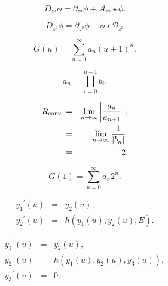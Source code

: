 \documentclass[]{article}
\begin{document}
	









\begin{equation}\label{eq:uplus-cd}
	D_{z^a}\phi = \partial_{z^a}\phi+\mathcal{A}_{z^a}\star\phi.
\end{equation}




\begin{equation}
	D_{z^a}\phi = \partial_{z^a}\phi-\phi\star\mathcal{B}_{z^a}
\end{equation}











\begin{equation}
	\label{ansatza}
	G(u) = \sum_{n=0}^{\infty} a_n \left(u+1 \right)^n.
\end{equation}





\begin{equation}
	a_n = \prod_{i=0}^{n-1} b_i.
\end{equation}



\begin{eqnarray}
	\nonumber
	R_{{\rm conv.}} &=& \lim_{n \to \infty} \left| \frac{a_n}{a_{n+1}} \right|, \\
	\nonumber
	&=& \lim_{n \to \infty} \frac{1}{ |b_n| },  \\
	&=& 2. 
\end{eqnarray}

\begin{equation}
	\label{G(1)}
	G(1) = \sum_{n=0}^\infty a_n 2^n.
\end{equation}





\begin{eqnarray}
	\nonumber
	{y_1}^\prime (u) &=& y_2(u), \\
	{y_2}^\prime (u) &=& h\left(y_1(u),y_2(u),E \right).
\end{eqnarray}

\begin{eqnarray}
	\label{system}
	\nonumber
	{y_1}^\prime (u) &=& y_2(u), \\
	\nonumber
	{y_2}^\prime (u) &=& h \left( y_1(u),y_2(u),y_3(u) \right), \\
	{y_3}^\prime (u) &=& 0.
\end{eqnarray}
\end{document}
